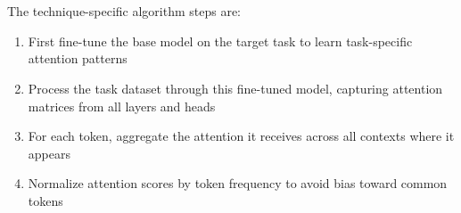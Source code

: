 \documentclass[twocolumn]{article}
\begin{document}
\\ \\
The technique-specific algorithm steps are:
\begin{enumerate}
    \item First fine-tune the base model on the target task to learn task-specific attention patterns
    \item Process the task dataset through this fine-tuned model, capturing attention matrices from all layers and heads
    \item For each token, aggregate the attention it receives across all contexts where it appears
    \item Normalize attention scores by token frequency to avoid bias toward common tokens
\end{enumerate}
\end{document}
